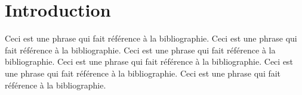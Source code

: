 \section{Introduction}
\lipsum
Ceci est une phrase qui fait référence à la bibliographie\cite{bibliotest}.
Ceci est une phrase qui fait référence à la bibliographie\cite{bibliotest}.
Ceci est une phrase qui fait référence à la bibliographie\cite{bibliotest}.
Ceci est une phrase qui fait référence à la bibliographie\cite{bibliotest}.
Ceci est une phrase qui fait référence à la bibliographie\cite{bibliotest}.
Ceci est une phrase qui fait référence à la bibliographie\cite{bibliotest}.
